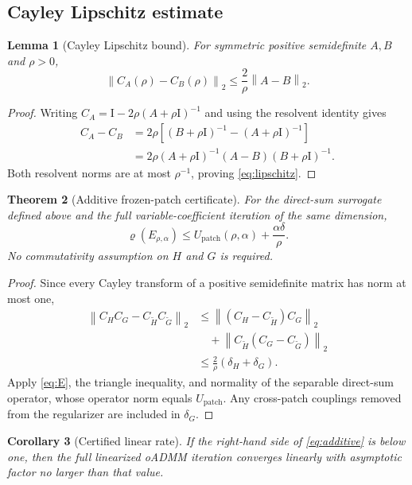 \documentclass[11pt]{article}
\newtheorem{theorem}{Theorem}[section]
\newtheorem{lemma}[theorem]{Lemma}
\newtheorem{corollary}[theorem]{Corollary}
\newcommand{\norm}[1]{\left\lVert #1\right\rVert}
\newcommand{\spr}{\varrho}
\newcommand{\Id}{\mathrm{I}}
\newcommand{\Ulfa}{U_{\mathrm{patch}}}
\begin{document}
\subsection{Cayley Lipschitz estimate}
\begin{lemma}[Cayley Lipschitz bound]\label{lem:lipschitz}
For symmetric positive semidefinite $A,B$ and $\rho>0$,
\begin{equation}
\norm{C_A(\rho)-C_B(\rho)}_2
\le\frac{2}{\rho}\norm{A-B}_2.
\label{eq:lipschitz}
\end{equation}
\end{lemma}
\begin{proof}
Writing $C_A=\Id-2\rho(A+\rho\Id)^{-1}$ and using the resolvent identity gives
\[
\begin{aligned}
C_A-C_B
&=2\rho\left[(B+\rho\Id)^{-1}-(A+\rho\Id)^{-1}\right]\\
&=2\rho(A+\rho\Id)^{-1}(A-B)(B+\rho\Id)^{-1}.
\end{aligned}
\]
Both resolvent norms are at most $\rho^{-1}$, proving
\eqref{eq:lipschitz}.
\end{proof}

\begin{theorem}[Additive frozen-patch certificate]\label{thm:additive}
For the direct-sum surrogate defined above and the full variable-coefficient
iteration of the same dimension,
\begin{equation}
\spr(E_{\rho,\alpha})
\le\Ulfa(\rho,\alpha)+\frac{\alpha\delta}{\rho}.
\label{eq:additive}
\end{equation}
No commutativity assumption on $H$ and $G$ is required.
\end{theorem}
\begin{proof}
Since every Cayley transform of a positive semidefinite matrix has norm at most
one,
\[
\begin{aligned}
\norm{C_HC_G-C_{\widetilde H}C_{\widetilde G}}_2
&\le\norm{(C_H-C_{\widetilde H})C_G}_2\\
&\quad+\norm{C_{\widetilde H}(C_G-C_{\widetilde G})}_2\\
&\le\frac{2}{\rho}(\delta_H+\delta_G).
\end{aligned}
\]
Apply \eqref{eq:E}, the triangle inequality, and normality of the separable
direct-sum operator, whose operator norm equals $\Ulfa$. Any
cross-patch couplings removed from the regularizer are included in $\delta_G$.
\end{proof}

\begin{corollary}[Certified linear rate]
If the right-hand side of \eqref{eq:additive} is below one, then the full
linearized oADMM iteration converges linearly with asymptotic factor no larger
than that value.
\end{corollary}
\end{document}
